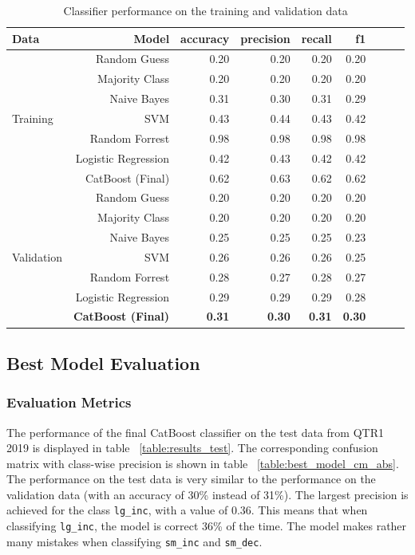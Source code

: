 \documentclass{article}
\begin{document}
	\begin{table}[h!]
		\centering
		\caption{Classifier performance on the training and validation data}
		\label{table:results_train_valid}
		
		\begin{tabular}{lrrrrrrrr}
			\toprule
			Data & Model &     accuracy &     precision &     recall &    f1 \\
			\midrule
			& Random Guess   &  0.20 &  0.20 &   0.20 &  0.20 \\
			& Majority Class &    0.20 &  0.20 &   0.20 &   0.20 \\
			& Naive Bayes       &   0.31 & 0.30 &  0.31 &  0.29 \\
			Training & SVM      &  0.43 & 0.44 & 0.43 &  0.42 \\
			& Random Forrest      &  0.98 & 0.98 & 0.98 &  0.98 \\
			& Logistic Regression   &  0.42 & 0.43 & 0.42 &  0.42 \\
			& CatBoost (Final)   &  0.62 & 0.63 &  0.62 & 0.62 \\
			\midrule
			& Random Guess   &  0.20 &  0.20 &   0.20 &  0.20 \\
			& Majority Class &    0.20 &  0.20 &   0.20 &   0.20 \\
			& Naive Bayes       &   0.25 & 0.25 &  0.25 &  0.23 \\
			Validation & SVM      &  0.26 & 0.26 & 0.26 & 0.25 \\
			& Random Forrest      &  0.28 & 0.27 & 0.28 & 0.27 \\
			& Logistic Regression   &  0.29 & 0.29 &  0.29 &  0.28 \\
			& \textbf{CatBoost (Final)}  &  \textbf{0.31} & \textbf{0.30} & \textbf{ 0.31} & \textbf{0.30} \\
			\bottomrule
		\end{tabular}
		
	\end{table}%

	\subsection{Best Model Evaluation}
	
	\subsubsection{Evaluation Metrics}

	The performance of the final CatBoost classifier on the test data from QTR1 2019 is displayed in table ~\ref{table:results_test}. The corresponding confusion matrix with class-wise precision is shown in table ~\ref{table:best_model_cm_abs}. The performance on the test data is very similar to the performance on the validation data (with an accuracy of 30\% instead of 31\%). The largest precision is achieved for the class \lstinline{lg_inc}, with a value of 0.36. This means that when classifying \lstinline{lg_inc}, the model is correct 36\% of the time. The model makes rather many mistakes when classifying \lstinline{sm_inc} and \lstinline{sm_dec}.
\end{document}
